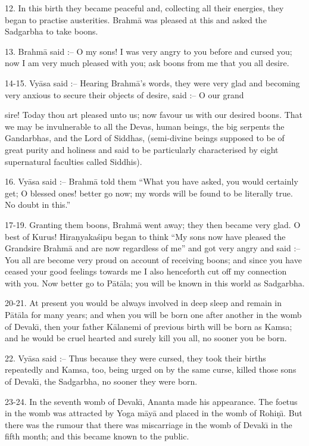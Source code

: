 12. In this birth they became peaceful and, collecting all their energies, they began to practise austerities. Brahm\=a was pleased at this and asked the Sadgarbha to take boons.

13. Brahm\=a said :-- O my sons! I was very angry to you before and cursed you; now I am very much pleased with you; ask boons from me that you all desire.

14-15. Vy\=asa said :-- Hearing Brahm\=a's words, they were very glad and becoming very anxious to secure their objects of desire, said :-- O our grand

sire! Today thou art pleased unto us; now favour us with our desired boons. That we may be invulnerable to all the Devas, human beings, the big serpents the Gandarbhas, and the Lord of Siddhas, (semi-divine beings supposed to be of great purity and holiness and said to be particularly characterised by eight supernatural faculties called Siddhis).

16. Vy\=asa said :-- Brahm\=a told them ``What you have asked, you would certainly get; O blessed ones! better go now; my words will be found to be literally true. No doubt in this.''

17-19. Granting them boons, Brahm\=a went away; they then became very glad. O best of Kurus! Hira\d{n}yaka\'sipu began to think ``My sons now have pleased the Grandsire Brahm\=a and are now regardless of me'' and got very angry and said :-- You all are become very proud on account of receiving boons; and since you have ceased your good feelings towards me I also henceforth cut off my connection with you. Now better go to P\=at\=ala; you will be known in this world as Sadgarbha.

20-21. At present you would be always involved in deep sleep and remain in P\=at\=ala for many years; and when you will be born one after another in the womb of Devak\={\i}, then your father K\=alanemi of previous birth will be born as Kamsa; and he would be cruel hearted and surely kill you all, no sooner you be born.

22. Vy\=asa said :-- Thus because they were cursed, they took their births repeatedly and Kamsa, too, being urged on by the same curse, killed those sons of Devak\={\i}, the Sadgarbha, no sooner they were born.

23-24. In the seventh womb of Devak\={\i}, Ananta made his appearance. The foetus in the womb was attracted by Yoga m\=ay\=a and placed in the womb of Rohi\d{n}\={\i}. But there was the rumour that there was miscarriage in the womb of Devak\={\i} in the fifth month; and this became known to the public.

